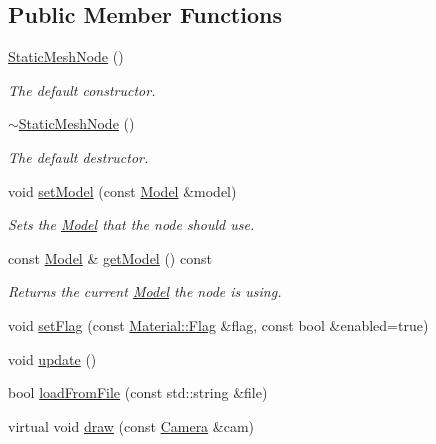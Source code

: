 \subsection*{Public Member Functions}
\begin{DoxyCompactItemize}
\item 
\hyperlink{classburn_1_1_static_mesh_node_a051ef5fe091cf8e93cc4dd1bae753cbd}{Static\-Mesh\-Node} ()
\begin{DoxyCompactList}\small\item\em The default constructor. \end{DoxyCompactList}\item 
\hyperlink{classburn_1_1_static_mesh_node_a68e00b329768da175ee153c46069364e}{$\sim$\-Static\-Mesh\-Node} ()
\begin{DoxyCompactList}\small\item\em The default destructor. \end{DoxyCompactList}\item 
void \hyperlink{classburn_1_1_static_mesh_node_aa89d9de19f56975acc63da0ca1eb3acc}{set\-Model} (const \hyperlink{classburn_1_1_model}{Model} \&model)
\begin{DoxyCompactList}\small\item\em Sets the \hyperlink{classburn_1_1_model}{Model} that the node should use. \end{DoxyCompactList}\item 
const \hyperlink{classburn_1_1_model}{Model} \& \hyperlink{classburn_1_1_static_mesh_node_a4458142e9f6d65a56ec5f8afae3aa99e}{get\-Model} () const 
\begin{DoxyCompactList}\small\item\em Returns the current \hyperlink{classburn_1_1_model}{Model} the node is using. \end{DoxyCompactList}\item 
void \hyperlink{classburn_1_1_static_mesh_node_af7c89e66e17b6178520f489a510214b4}{set\-Flag} (const \hyperlink{classburn_1_1_material_a704108f8bb133e1911495b84bd0826b8}{Material\-::\-Flag} \&flag, const bool \&enabled=true)
\item 
void \hyperlink{classburn_1_1_static_mesh_node_a6b1c25e72c7f1f873f1e9c6bd0aa4c18}{update} ()
\item 
bool \hyperlink{classburn_1_1_static_mesh_node_a6c571030b013c2b72d85bf36952de724}{load\-From\-File} (const std\-::string \&file)
\item 
virtual void \hyperlink{classburn_1_1_static_mesh_node_af8e0f846bf6c835fd8a9e7a334c076d6}{draw} (const \hyperlink{classburn_1_1_camera}{Camera} \&cam)

\end{DoxyCompactItemize}
